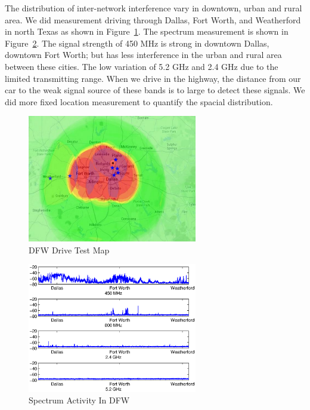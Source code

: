 The distribution of inter-network interference vary in downtown, urban and rural area.
We did measurement driving through Dallas, Fort Worth, and Weatherford in north Texas as shown in Figure~\ref{fig:drivemap}.
The spectrum measurement is shown in Figure~\ref{fig:drivetest}.
The signal strength of 450 MHz is strong in downtown Dallas, downtown Fort Worth;
but has less interference in the urban and rural area between these cities.
The low variation of 5.2 GHz and 2.4 GHz due to the limited transmitting range.
When we drive in the highway, the distance from our car to the weak signal source of these bands
is to large to detect these signals. We did more fixed location measurement to quantify
the spacial distribution. 
   \begin{figure}
   \centering
   \includegraphics[width=74mm]{figures/drivemap}
   \vspace{-0.1in}
   \caption{DFW Drive Test Map}                                                                 
   \label{fig:drivemap}
   \end{figure}
   
   
   \begin{figure}
   \centering
   \includegraphics[width=74mm]{figures/drivetest}
   \vspace{-0.1in}
   \caption{Spectrum Activity In DFW}                                                                 
   \label{fig:drivetest}
   \end{figure}

